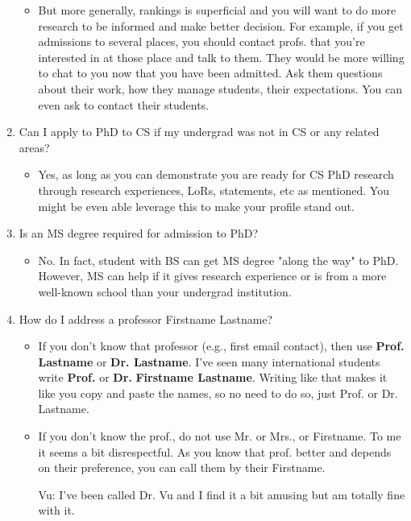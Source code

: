 \documentclass[11pt]{article}
\newenvironment{commentbox}{
 \small
    \begin{cbox}
 }{
   \end{cbox}
}
\begin{document}
\begin{enumerate}
\begin{itemize}[leftmargin=*]
\item But more generally, rankings is superficial and you will want to do more research to be informed and make better decision. For example, if you get admissions to several places, you should contact profs. that you're interested in at those place and talk to them. They would be more willing to chat to you now that you have been admitted.  Ask them questions about their work, how they manage students, their expectations. You can even ask to contact their students.
\end{itemize}

    \item Can I apply to PhD to CS if my undergrad was not in CS or any related areas?
    \begin{itemize}[leftmargin=*]
        \item Yes, as long as you can demonstrate you are ready for CS PhD research through research experiences, LoRs, statements, etc as mentioned. You might be even able leverage this to make your profile stand out.
    \end{itemize}


    \item   Is an MS degree required for admission to PhD?
    \begin{itemize}[leftmargin=*]
    \item No. In fact, student with BS can get MS degree "along the way" to PhD.  However, MS can help if it gives research experience or is from a more well-known school than your undergrad institution.
    \end{itemize}    
    
    \item How do I address a professor Firstname Lastname?
    \begin{itemize}[leftmargin=*]
        \item If you don't know that professor (e.g., first email contact), then use \textbf{Prof. Lastname} or \textbf{Dr. Lastname}. I've seen many international students write \textbf{Prof.} or \textbf{Dr.} \textbf{Firstname Lastname}.  Writing like that makes it like you copy and paste the names, so no need to do so,  just Prof. or Dr. Lastname.
        
 \item If you don't know the prof., do not use Mr. or Mrs., or Firstname. To me it seems a bit disrespectful. As you know that prof. better and depends on their preference, you can call them by their Firstname.


\begin{commentbox}
    Vu: I've been called Dr. Vu and I find it a bit amusing but am totally fine with it.
    \end{commentbox}
    \end{itemize}
\end{enumerate}
\end{document}
